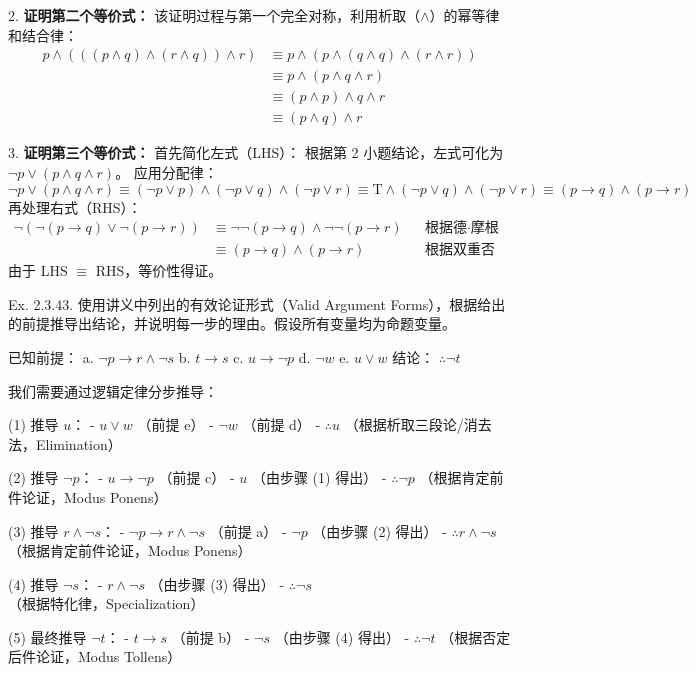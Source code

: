 \begin{questions}
\begin{solution}
2. \textbf{证明第二个等价式：}
该证明过程与第一个完全对称，利用析取（$\wedge$）的幂等律和结合律：
\begin{align*}
p \wedge (((p \wedge q) \wedge (r \wedge q)) \wedge r) &\equiv p \wedge (p \wedge (q \wedge q) \wedge (r \wedge r)) \\
&\equiv p \wedge (p \wedge q \wedge r) \\
&\equiv (p \wedge p) \wedge q \wedge r \\
&\equiv (p \wedge q) \wedge r
\end{align*}

3. \textbf{证明第三个等价式：}
首先简化左式（LHS）：
根据第 2 小题结论，左式可化为 $\neg p \lor (p \wedge q \wedge r)$。
应用分配律：
\[
\neg p \lor (p \wedge q \wedge r) \equiv (\neg p \lor p) \wedge (\neg p \lor q) \wedge (\neg p \lor r) \equiv \text{T} \wedge (\neg p \lor q) \wedge (\neg p \lor r) \equiv (p \to q) \wedge (p \to r)
\]
再处理右式（RHS）：
\begin{align*}
\neg(\neg(p \to q) \lor \neg(p \to r)) &\equiv \neg\neg(p \to q) \wedge \neg\neg(p \to r) && \text{根据德·摩根定律} \\
&\equiv (p \to q) \wedge (p \to r) && \text{根据双重否定律}
\end{align*}
由于 LHS $\equiv$ RHS，等价性得证。
\end{solution}

\question
Ex. 2.3.43. 使用讲义中列出的有效论证形式（Valid Argument Forms），根据给出的前提推导出结论，并说明每一步的理由。假设所有变量均为命题变量。

已知前提：
a. $\neg p \to r \wedge \neg s$
b. $t \to s$
c. $u \to \neg p$
d. $\neg w$
e. $u \lor w$
结论： $\therefore \neg t$

\begin{solution}
我们需要通过逻辑定律分步推导：

(1) 推导 $u$：
- $u \lor w$ （前提 e）
- $\neg w$ （前提 d）
- $\therefore u$ （根据析取三段论/消去法，Elimination）

(2) 推导 $\neg p$：
- $u \to \neg p$ （前提 c）
- $u$ （由步骤 (1) 得出）
- $\therefore \neg p$ （根据肯定前件论证，Modus Ponens）

(3) 推导 $r \wedge \neg s$：
- $\neg p \to r \wedge \neg s$ （前提 a）
- $\neg p$ （由步骤 (2) 得出）
- $\therefore r \wedge \neg s$ （根据肯定前件论证，Modus Ponens）

(4) 推导 $\neg s$：
- $r \wedge \neg s$ （由步骤 (3) 得出）
- $\therefore \neg s$ （根据特化律，Specialization）

(5) 最终推导 $\neg t$：
- $t \to s$ （前提 b）
- $\neg s$ （由步骤 (4) 得出）
- $\therefore \neg t$ （根据否定后件论证，Modus Tollens）


\end{solution}
\end{questions}

